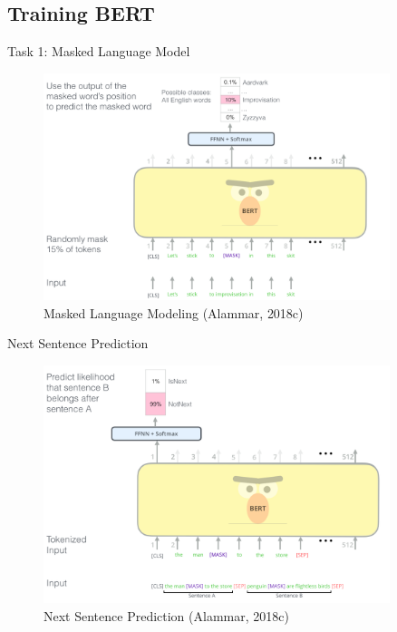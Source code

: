 \documentclass[10pt]{beamer}
\begin{document}
\subsection{Training BERT}


\begin{frame}{Task 1: Masked Language Model}

\begin{figure}[h]
\centering
\includegraphics[width=0.9\textwidth]{fig/BERT-language-modeling-masked-lm.png}
\caption{Masked Language Modeling (Alammar, 2018c)}
\end{figure}

\end{frame}


\begin{frame}{Next Sentence Prediction}

\begin{figure}[h]
\centering
\includegraphics[width=0.9\textwidth]{fig/bert-next-sentence-prediction.png}
\caption{Next Sentence Prediction (Alammar, 2018c)}
\end{figure}

\end{frame}
\end{document}
